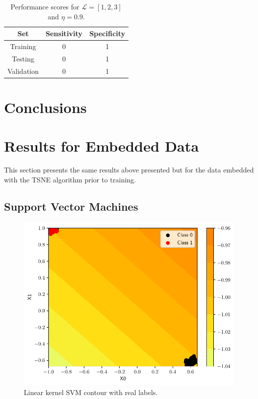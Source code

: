 \documentclass[conference]{IEEEtran}
\theoremstyle{definition}
\theoremstyle{remark}
\theoremstyle{remark}
\begin{document}
\begin{table}
\centering
\caption{Performance scores for $\mathcal{L}=[1,2,3]$ and $\eta=0.9$.}
\label{tab:L123}
\begin{tabular}{ccc}
\hline
\textbf{Set} & \textbf{Sensitivity} & \textbf{Specificity} \\ \hline
Training & 0 & 1 \\
Testing & 0 & 1 \\
Validation & 0 & 1 \\ \hline
\end{tabular}
\end{table}

\section{Conclusions}\label{sec:conc}

\printbibliography

\newpage
\appendices

\section{Results for Embedded Data}
This section presents the same results above presented but for the data
embedded with the TSNE algorithm prior to training.
\subsection{Support Vector Machines}
\begin{figure}
  \includegraphics[width=\columnwidth]{figs/svm-emb-linear-contour-0-1.pdf}
  \caption{Linear kernel SVM contour with real labels.}
\end{figure}
\end{document}
